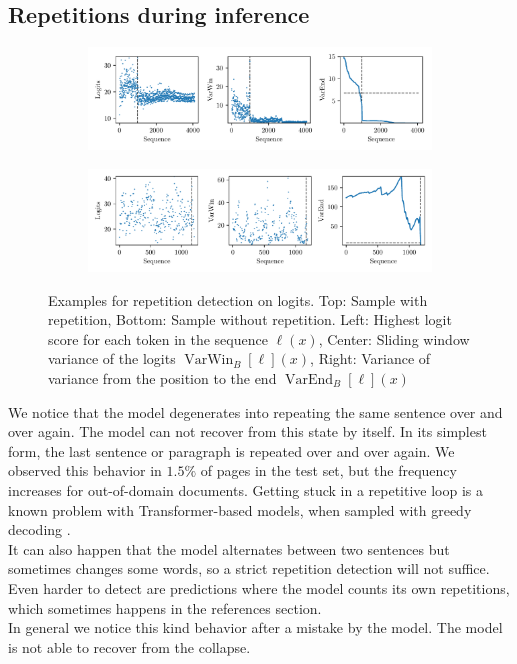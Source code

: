 \documentclass[]{article}
\begin{document}
\subsection{Repetitions during inference}\label{seq:repeptition}
\begin{figure}
    \centering
    \begin{subfigure}[b]{0.95\textwidth}
       \includegraphics[width=1\linewidth]{figures/repetition_hal.pdf}
       \label{fig:rephal} 
    \end{subfigure}
    \begin{subfigure}[b]{0.95\textwidth}
       \includegraphics[width=1\linewidth]{figures/repetition_nohal.pdf}
       \label{fig:repnohal}
    \end{subfigure}
    \caption{Examples for repetition detection on logits. Top: Sample with repetition, Bottom: Sample without repetition. Left: Highest logit score for each token in the sequence $\ell(x)$, Center: Sliding window variance of the logits $\operatorname{VarWin}_B[\ell](x)$, Right: Variance of variance from the position to the end $\operatorname{VarEnd}_B[\ell](x)$}
    \label{fig:repetition}
\end{figure}
We notice that the model degenerates into repeating the same sentence over and over again. The model can not recover from this state by itself. In its simplest form, the last sentence or paragraph is repeated over and over again. We observed this behavior in $1.5\%$ of pages in the test set, but the frequency increases for out-of-domain documents. Getting stuck in a repetitive loop is a known problem with Transformer-based models, when sampled with greedy decoding \cite{holtzman_curious_2020}.\\
It can also happen that the model alternates between two sentences but sometimes changes some words, so a strict repetition detection will not suffice. Even harder to detect are predictions where the model counts its own repetitions, which sometimes happens in the references section.\\
In general we notice this kind behavior after a mistake by the model. The model is not able to recover from the collapse.
\end{document}
